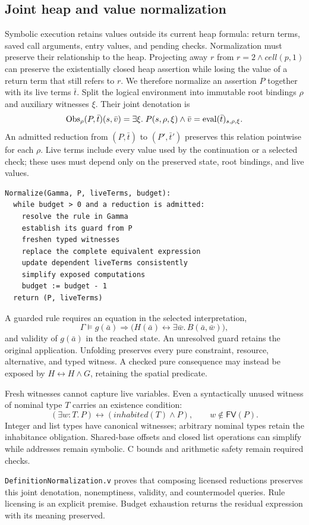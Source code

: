 \subsection{Joint heap and value normalization}
\label{sec:normalization-algorithm}
\label{sec:normalization}
Symbolic execution retains values outside its current heap formula:
return terms, saved call arguments, entry values, and pending checks.
Normalization must preserve their relationship to the heap.
Projecting away $r$ from $r=2\land\mathit{cell}(p,1)$ can preserve the
existentially closed heap assertion while losing the value of a return term
that still refers to $r$. We therefore normalize an assertion $P$ together
with its live terms $\bar t$. Split the logical environment into immutable
root bindings $\rho$ and auxiliary witnesses $\xi$. Their joint denotation is
\[
\operatorname{Obs}_\rho(P,\bar t)(s,\bar v)
 =\exists\xi.\;P(s,\rho,\xi)\land
   \bar v=\operatorname{eval}(\bar t)_{s,\rho,\xi}.
\]
An admitted reduction from $(P,\bar t)$ to $(P',\bar t')$ preserves this
relation pointwise for each $\rho$. Live terms include every value used by
the continuation or a selected check; these uses must depend only on the
preserved state, root bindings, and live values.

\begin{lstlisting}[language={},caption={Normalize the heap and its live values together.},label={lst:normalize}]
Normalize(Gamma, P, liveTerms, budget):
  while budget > 0 and a reduction is admitted:
    resolve the rule in Gamma
    establish its guard from P
    freshen typed witnesses
    replace the complete equivalent expression
    update dependent liveTerms consistently
    simplify exposed computations
    budget := budget - 1
  return (P, liveTerms)
\end{lstlisting}

A guarded rule requires an equation in the selected interpretation,
\[
\Gamma\models g(\bar a)\Rightarrow
 \bigl(H(\bar a)\leftrightarrow\exists\bar w.\,B(\bar a,\bar w)\bigr),
\]
and validity of $g(\bar a)$ in the reached state. An unresolved guard retains
the original application. Unfolding preserves every pure constraint, resource,
alternative, and typed witness. A checked pure consequence may instead be
exposed by $H\leftrightarrow H\land G$, retaining the spatial predicate.

Fresh witnesses cannot capture live variables. Even a syntactically unused
witness of nominal type $T$ carries an existence condition:
\[
(\exists w:T.\,P)\leftrightarrow
(\mathit{inhabited}(T)\land P),\qquad w\notin\mathsf{FV}(P).
\]
Integer and list types have canonical witnesses; arbitrary nominal types
retain the inhabitance obligation. Shared-base offsets and closed list
operations can simplify while addresses remain symbolic. C bounds and
arithmetic safety remain required checks.

\texttt{DefinitionNormalization.v} proves that composing licensed reductions
preserves this joint denotation, nonemptiness, validity, and countermodel
queries. Rule licensing is an explicit premise. Budget exhaustion returns
the residual expression with its meaning preserved.
